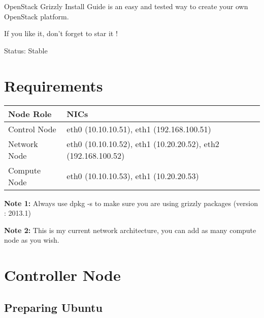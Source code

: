 OpenStack Grizzly Install Guide is an easy and tested way to create your
own OpenStack platform.

If you like it, don't forget to star it !

Status: Stable

\chapter{Requirements}
\label{requirements}

\begin{table}[htbp]
\begin{minipage}{\linewidth}
\setlength{\tymax}{0.5\linewidth}
\centering
\small
\begin{tabulary}{\textwidth}{@{}LL@{}} \toprule
Node Role&NICs\\
\midrule
Control Node&eth0 (10.10.10.51), eth1 (192.168.100.51)\\
Network Node&eth0 (10.10.10.52), eth1 (10.20.20.52), eth2 (192.168.100.52)\\
Compute Node&eth0 (10.10.10.53), eth1 (10.20.20.53) \\

\bottomrule

\end{tabulary}
\end{minipage}
\end{table}


\textbf{Note 1:} Always use dpkg -s  to make sure you are using
grizzly packages (version : 2013.1)

\textbf{Note 2:} This is my current network architecture, you can add as many
compute node as you wish.

\chapter{Controller Node}
\label{controllernode}

\section{Preparing Ubuntu}
\label{preparingubuntu}

